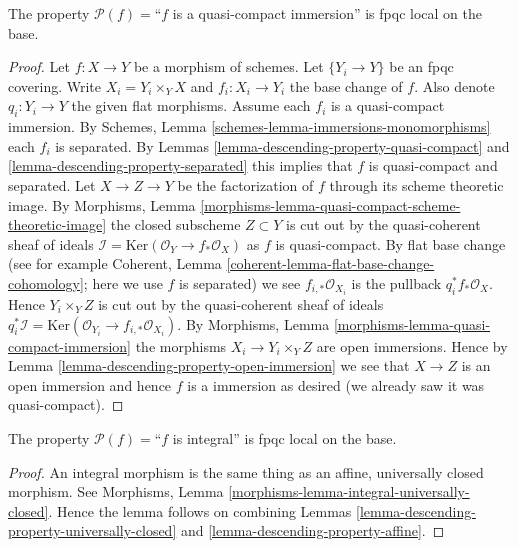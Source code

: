 \begin{lemma}
\label{lemma-descending-property-quasi-compact-immersion}
The property $\mathcal{P}(f) =$``$f$ is a quasi-compact immersion''
is fpqc local on the base.
\end{lemma}

\begin{proof}
Let $f : X \to Y$ be a morphism of schemes.
Let $\{Y_i \to Y\}$ be an fpqc covering.
Write $X_i = Y_i \times_Y X$ and $f_i : X_i \to Y_i$
the base change of $f$. Also denote
$q_i : Y_i \to Y$ the given flat morphisms.
Assume each $f_i$ is a quasi-compact immersion.
By Schemes, Lemma \ref{schemes-lemma-immersions-monomorphisms}
each $f_i$ is separated.
By Lemmas \ref{lemma-descending-property-quasi-compact} and
\ref{lemma-descending-property-separated}
this implies that $f$ is quasi-compact and separated.
Let $X \to Z \to Y$ be the factorization of $f$ through its
scheme theoretic image. By
Morphisms, Lemma \ref{morphisms-lemma-quasi-compact-scheme-theoretic-image}
the closed subscheme $Z \subset Y$ is cut out by the
quasi-coherent sheaf of ideals
$\mathcal{I} = \text{Ker}(\mathcal{O}_Y \to f_*\mathcal{O}_X)$
as $f$ is quasi-compact. By flat base change
(see for example
Coherent, Lemma \ref{coherent-lemma-flat-base-change-cohomology};
here we use $f$ is separated)
we see $f_{i, *}\mathcal{O}_{X_i}$ is the pullback $q_i^*f_*\mathcal{O}_X$.
Hence $Y_i \times_Y Z$ is cut out by the
quasi-coherent sheaf of ideals $q_i^*\mathcal{I} = 
\text{Ker}(\mathcal{O}_{Y_i} \to f_{i, *}\mathcal{O}_{X_i})$.
By Morphisms, Lemma \ref{morphisms-lemma-quasi-compact-immersion}
the morphisms $X_i \to Y_i \times_Y Z$
are open immersions. Hence by
Lemma \ref{lemma-descending-property-open-immersion}
we see that $X \to Z$ is an open immersion and
hence $f$ is a immersion as desired
(we already saw it was quasi-compact).
\end{proof}

\begin{lemma}
\label{lemma-descending-property-integral}
The property $\mathcal{P}(f) =$``$f$ is integral''
is fpqc local on the base.
\end{lemma}

\begin{proof}
An integral morphism is the same thing as an affine,
universally closed morphism. See
Morphisms, Lemma \ref{morphisms-lemma-integral-universally-closed}.
Hence the lemma follows on combining
Lemmas \ref{lemma-descending-property-universally-closed}
and \ref{lemma-descending-property-affine}.
\end{proof}

